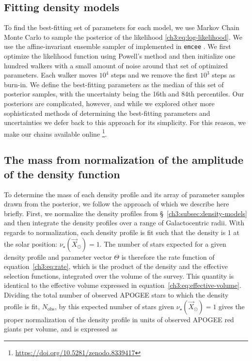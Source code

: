 \subsection{Fitting density models}
\label{ch3:subsec:fitting-density-models}

To find the best-fitting set of parameters for each model, we use Markov Chain Monte Carlo to sample the posterior of the likelihood \eqref{ch3:eq:log-likelihood}. We use the affine-invariant ensemble sampler of \textcite{goodman10} implemented in \texttt{emcee} \parencite{foreman-mackey13}. We first optimize the likelihood function using Powell's method \parencite{powell64} and then initialize one hundred walkers with a small amount of noise around that set of optimized parameters. Each walker moves $10^{4}$ steps and we remove the first $10^{3}$ steps as burn-in. We define the best-fitting parameters as the median of this set of posterior samples, with the uncertainty being the 16th and 84th percentiles. Our posteriors are complicated, however, and while we explored other more sophisticated methods of determining the best-fitting parameters and uncertainties we defer back to this approach for its simplicity. For this reason, we make our chains available online \footnote{\url{https://doi.org/10.5281/zenodo.8339417}}.

\subsection{The mass from normalization of the amplitude of the density function}
\label{ch3:subsec:mass-calculation-from-normalization}

To determine the mass of each density profile and its array of parameter samples drawn from the posterior, we follow the approach of \cite{mackereth20} which we describe here briefly. First, we normalize the density profiles from \S~\ref{ch3:subsec:density-models} and then integrate the density profiles over a range of Galactocentric radii. With regards to normalization, each density profile is fit such that the density is 1 at the solar position: $\nu_{\star}(\vec{X}_{\odot}) = 1$. The number of stars expected for a given density profile and parameter vector $\Theta$ is therefore the rate function of equation~\eqref{ch3:eq:rate}, which is the product of the density and the effective selection functions, integrated over the volume of the survey. This quantity is identical to the effective volume expressed in equation~\eqref{ch3:eq:effective-volume}. Dividing the total number of observed APOGEE stars to which the density profile is fit, $N_{\mathrm{obs}}$, by this expected number of stars given $\nu_{\star}(\vec{X}_{\odot}) = 1$ gives the proper normalization of the density profile in units of observed APOGEE red giants per volume, and is expressed as

